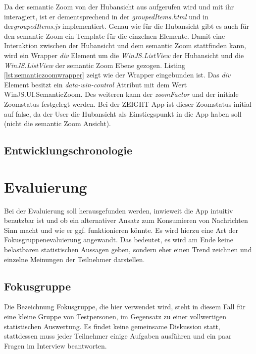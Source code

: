 \documentclass[12pt,a4paper,bibtotoc]{scrartcl}
\begin{document}
Da der semantic Zoom von der Hubansicht aus aufgerufen wird und mit ihr interagiert, ist er dementsprechend in der \textit{groupedItems.html} und in der\textit{groupedItems.js} implementiert. Genau wie für die Hubansicht gibt es auch für den semantic Zoom ein Template für die einzelnen Elemente. Damit eine Interaktion zwischen der Hubansicht und dem semantic Zoom stattfinden kann, wird ein Wrapper \textit{div} Element um die \textit{WinJS.ListView} der Hubansicht und die \textit{WinJS.ListView} der semantic Zoom Ebene gezogen. Listing \ref{lst:semanticzoomwrapper} zeigt wie der Wrapper eingebunden ist. Das \textit{div} Element besitzt ein \textit{data-win-control} Attribut mit dem Wert \glqq WinJS.UI.SemanticZoom\grqq. Des weiteren kann der \textit{zoomFactor} und der initiale Zoomstatus festgelegt werden. Bei der ZEIGHT App ist dieser Zoomstatus initial auf false, da der User die Hubansicht als Einstiegspunkt in die App haben soll (nicht die semantic Zoom Ansicht).

\begin{minipage}{\linewidth}
  
\end{minipage}

\subsection{Entwicklungschronologie}
\label{subsec:entwicklungschronologie}


\newpage
\section{Evaluierung} 
\label{sec:evaluierung}
Bei der Evaluierung soll herausgefunden werden, inwieweit die App intuitiv benutzbar ist und ob ein alternativer Ansatz zum Konsumieren von Nachrichten Sinn macht und wie er ggf. funktionieren könnte. Es wird hierzu eine Art der Fokusgruppenevaluierung angewandt. Das bedeutet, es wird am Ende keine belastbaren statistischen Aussagen geben, sondern eher einen Trend zeichnen und einzelne Meinungen der Teilnehmer darstellen.

\subsection{Fokusgruppe}
\label{subsec:fokusgruppe}
Die Bezeichnung \glqq Fokusgruppe\grqq, die hier verwendet wird, steht in diesem Fall für eine kleine Gruppe von Testpersonen, im Gegensatz zu einer vollwertigen statistischen Auswertung. Es findet keine gemeinsame Diskussion statt, stattdessen muss jeder Teilnehmer einige Aufgaben ausführen und ein paar Fragen im Interview beantworten.
\end{document}
